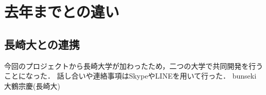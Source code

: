 \section{去年までとの違い}
\subsection{長崎大との連携}
 今回のプロジェクトから長崎大学が加わったため，二つの大学で共同開発を行うことになった．
 話し合いや連絡事項はSkypeやLINEを用いて行った．
bunseki{大鶴宗慶(長崎大)}
